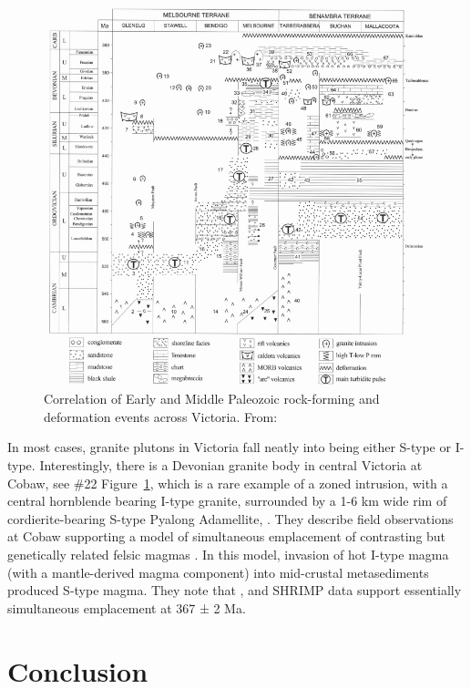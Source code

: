 \documentclass[a4paper]{article}
\begin{document}
\begin{figure}[H]
\centering
\includegraphics[width=1\textwidth]{rockFormingAndDeformation.jpg}
\caption{\label{fig:VicRockDefermation}Correlation of Early and Middle Paleozoic rock-forming and deformation events across Victoria. From: \cite{moorel1998palaeozoic}}
\end{figure}

In most cases, granite plutons in Victoria fall neatly into being either S-type or I-type. Interestingly, there is a Devonian granite body in central Victoria at Cobaw, see \#22 Figure~\ref{fig:VicRockDefermation}, which is a rare example of a zoned intrusion, with a central hornblende bearing I-type granite, surrounded by a 1-6 km wide rim of cordierite-bearing S-type Pyalong Adamellite, \cite{waight2000fingerprinting}. They describe field observations at Cobaw supporting a model of simultaneous emplacement of contrasting but genetically related felsic magmas  \cite{waight2001geochemical}. In this model, invasion of hot I-type magma (with a mantle-derived magma component) into mid-crustal metasediments produced S-type magma. They note that ,  and SHRIMP  data support essentially simultaneous emplacement at 367 ± 2 Ma. \cite{waight2000fingerprinting}

\section{Conclusion}
\end{document}

